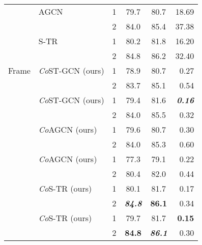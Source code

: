 \documentclass[journal]{IEEEtran}
\newcommand\paretocolor{lgreen!20}
\theoremstyle{definition}
\begin{document}
\begin{table}[!tbp]
\begin{center}
{\begin{tabular}{llcccr}
    & AGCN                                & 1         & 79.7      & 80.7  & 18.69 \\
    &                                               & 2         & 84.0      & 85.4  & 37.38 \\
  
    & S-TR                                & 1         & 80.2      & 81.8  & 16.20 \\ 
    &                                               & 2         & 84.8      & 86.2  & 32.40 \\

    \midrule
    Frame 
    & \textit{Co}ST-GCN (ours)                      & 1         & 78.9      & 80.7     & 0.27 \\
    &                                               & 2         & 83.7      & 85.1     & 0.54 \\
    & \textit{Co}ST-GCN (ours)                  & 1         & 79.4      & 81.6     & \textbf{\textit{0.16}} \\
    &                                               & 2         & 84.0      & 85.5     & 0.32 \\
    & \textit{Co}AGCN (ours)                        & 1         & 79.6      & 80.7     & 0.30 \\
    &                                               & 2         & 84.0      & 85.3     & 0.60 \\
    & \textit{Co}AGCN (ours)                    & 1         & 77.3      & 79.1     & 0.22 \\
    &                                               & 2         & 80.4      & 82.0     & 0.44 \\
    & \textit{Co}S-TR (ours)                        & 1         & \colorbox{\paretocolor}{80.1}      & 81.7     & \colorbox{\paretocolor}{0.17} \\
    &                                               & 2         & \textbf{\textit{84.8}}      & \colorbox{\paretocolor}{\textbf{86.1}}     & \colorbox{\paretocolor}{0.34} \\
    & \textit{Co}S-TR (ours)                    & 1         & \colorbox{\paretocolor}{79.7}      & \colorbox{\paretocolor}{81.7}     & \colorbox{\paretocolor}{\textbf{0.15}} \\
    &                                               & 2         & \colorbox{\paretocolor}{\textbf{84.8}}      & \colorbox{\paretocolor}{\textbf{\textit{86.1}}}     & \colorbox{\paretocolor}{0.30} \\
    \bottomrule
\end{tabular}
}
\end{center}
\end{table}
\end{document}
